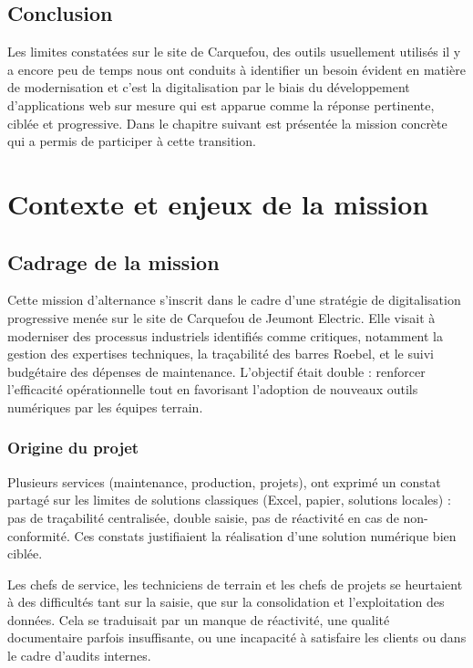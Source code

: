 \documentclass[11pt,a4paper]{article}
\begin{document}
\subsection{Conclusion}

Les limites constatées sur le site de Carquefou, des outils usuellement utilisés il y a encore peu de temps nous ont conduits à identifier un besoin évident en matière de modernisation et c’est la digitalisation par le biais du développement d’applications web sur mesure qui est apparue comme la réponse pertinente, ciblée et progressive. Dans le chapitre suivant est présentée la mission concrète qui a permis de participer à cette transition.



\newpage
\section{Contexte et enjeux de la mission}
\subsection{Cadrage de la mission}

Cette mission d'alternance s’inscrit dans le cadre d’une stratégie de digitalisation progressive menée sur le site de Carquefou de Jeumont Electric. Elle visait à moderniser des processus industriels identifiés comme critiques, notamment la gestion des expertises techniques, la traçabilité des barres Roebel, et le suivi budgétaire des dépenses de maintenance. L’objectif était double : renforcer l’efficacité opérationnelle tout en favorisant l’adoption de nouveaux outils numériques par les équipes terrain.

\subsubsection{Origine du projet}

Plusieurs services (maintenance, production, projets), ont exprimé un constat partagé sur les limites de solutions classiques (Excel, papier, solutions locales) : pas de traçabilité centralisée, double saisie, pas de réactivité en cas de non-conformité. Ces constats justifiaient la réalisation d’une solution numérique bien ciblée.

Les chefs de service, les techniciens de terrain et les chefs de projets se heurtaient à des difficultés tant sur la saisie, que sur la consolidation et l’exploitation des données. Cela se traduisait par un manque de réactivité, une qualité documentaire parfois insuffisante, ou une incapacité à satisfaire les clients ou dans le cadre d’audits internes.
\end{document}
